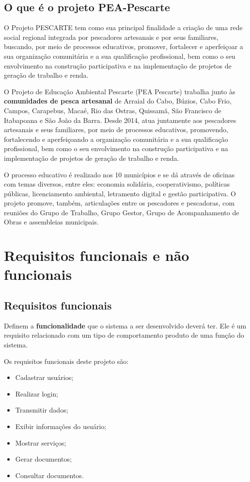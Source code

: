 \documentclass[a4paper]{abntex2}
\begin{document}
\subsection{O que é o projeto PEA-Pescarte}

O Projeto PESCARTE tem como sua principal finalidade a criação de uma rede social regional integrada por pescadores artesanais e por seus familiares, buscando, por meio de processos educativos, promover, fortalecer e aperfeiçoar a sua organização comunitária e a sua qualificação profissional, bem como o seu envolvimento na construção participativa e na implementação de projetos de geração de trabalho e renda.

O Projeto de Educação Ambiental Pescarte (PEA Pescarte) trabalha junto às \textbf{comunidades de pesca artesanal} de Arraial do Cabo, Búzios, Cabo Frio, Campos, Carapebus, Macaé, Rio das Ostras, Quissamã, São Francisco de Itabapoana e São João da Barra. Desde 2014, atua juntamente aos pescadores artesanais e seus familiares, por meio de processos educativos, promovendo, fortalecendo e aperfeiçoando a organização comunitária e a sua qualificação profissional, bem como o seu envolvimento na construção participativa e na implementação de projetos de geração de trabalho e renda.

O processo educativo é realizado nos 10 municípios e se dá através de oficinas com temas diversos, entre eles: economia solidária, cooperativismo, políticas públicas, licenciamento ambiental, letramento digital e gestão participativa. O projeto promove, também, articulações entre os pescadores e pescadoras, com reuniões do Grupo de Trabalho, Grupo Gestor, Grupo de Acompanhamento de Obras e assembleias municipais.

\section{Requisitos funcionais e não funcionais}

\subsection{Requisitos funcionais}

Definem a \textbf{funcionalidade} que o sistema a ser desenvolvido deverá ter. Ele é um requisito relacionado com um tipo de comportamento produto de uma função do sistema.

Os requisitos funcionais deste projeto são:

\begin{itemize}
    \item Cadastrar usuários;
    \item Realizar login;
    \item Transmitir dados;
    \item Exibir informações do usuário;
    \item Mostrar serviços;
    \item Gerar documentos;
    \item Consultar documentos.
\end{itemize}
\end{document}
